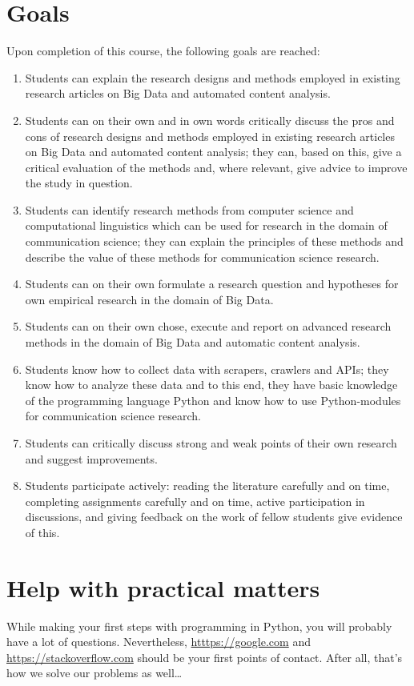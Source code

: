 \documentclass[a4paper,10pt,twocolumn]{report}
\begin{document}
\section{Goals}
Upon completion of this course, the following goals are reached:
\begin{enumerate}[A]
\item Students can explain the research designs and methods employed in existing research articles on Big Data and automated content analysis.
\item Students can on their own and in own words critically discuss the pros and cons of research designs and methods employed in existing research articles on Big Data and automated content analysis; they can, based on this, give a critical evaluation of the methods and, where relevant, give advice to improve the study in question.
\item Students can identify research methods from computer science and computational linguistics which can be used for research in the domain of communication science; they can explain the principles of these methods and describe the value of these methods for communication science research.
\item Students can on their own formulate a research question and hypotheses for own empirical research in the domain of Big Data.
\item Students can on their own chose, execute and report on advanced research methods in the domain of Big Data and automatic content analysis.
\item Students know how to collect data with scrapers, crawlers and APIs; they know how to analyze these data and to this end, they have basic knowledge of the programming language Python and know how to use Python-modules for communication science research.
\item Students can critically discuss  strong and weak points of their own research and suggest improvements.
\item Students participate actively: reading the literature carefully and on time, completing assignments carefully and on time, active participation in discussions, and giving feedback on the work of fellow students give evidence of this.
\end{enumerate}

\section{Help with practical matters}
While making your first steps with programming in Python, you will probably have a lot of questions.
Nevertheless, \url{htttps://google.com} and \url{https://stackoverflow.com} should be your first points of contact. After all, that's how we solve our problems as well\ldots
\end{document}
